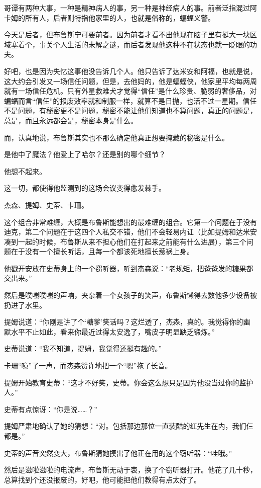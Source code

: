 \documentclass[../main.tex]{subfiles}
\begin{document}
哥谭有两种大事，一种是精神病人的事，另一种是神经病人的事。前者泛指混过阿卡姆的所有人，后者则特指他家里的人，也就是俗称的，蝙蝠义警。

今天是后者，但布鲁斯宁可要前者。因为前者才看不出他现在脑子里有挺大一块区域塞着个，事关个人生活的未解之谜，而后者发现他这种不在状态也就一眨眼的功夫。

好吧，也是因为失忆这事他没告诉几个人。他只告诉了达米安和阿福，也就是说，这大约会引发又一场信任问题，但是，去他妈的，他是蝙蝠侠，他家里平均每两周就有一场信任危机。只有外星救难犬才觉得“信任”是什么珍贵、脆弱的奢侈品，对蝙蝠而言“信任”的报废效率就和制服一样，就算不是日抛，也活不过一星期。信任不是问题，有秘密更不是问题，秘密不能让他们知道也不算问题，真正的问题是，总是，而且永远都会是，秘密本身是什么。

而，认真地说，布鲁斯其实也不那么确定他真正想要掩藏的秘密是什么。

是他中了魔法？他爱上了哈尔？还是别的哪个细节？

他想不起来。

这一切，都使得他监测到的这场会议变得愈发棘手。

杰森、提姆、史蒂、卡珊。

这个组合非常难缠，大概是布鲁斯能想出的最难缠的组合。它第一个问题在于没有迪克，第二个问题在于这四个人私交不错，他们不会轻易内讧（比如提姆和达米安凑到一起的时候，布鲁斯从来不担心他们在打起来之前能有什么进展），第三个问题在于没有一个擅长听话，且每一个都该死地擅长惹祸上身。

他戳开安放在史蒂身上的一个窃听器，听到杰森说：“老规矩，把爸爸发的糖果都交出来。”

然后是噗嗤噗嗤的声响，夹杂着一个女孩子的笑声，布鲁斯懒得去数他多少设备被扔进了水里。

提姆说道：“你刚是讲了个`糖爹'笑话吗？这烂透了，杰森，真的。我觉得你的幽默水平不止如此，看来你最近过得太安逸了，嘴皮子明显缺乏锻炼。”

史蒂说道：“我不知道，提姆，我觉得还挺有趣的。”

卡珊“噫”了一声，而杰森赞许地把一个“嗯”拖了长音。

提姆开始教育史蒂：“这才不好笑，史蒂。你会这么想只是因为他没当过你的监护人。”

史蒂有点惊讶：“你是说……？”

提姆严肃地确认了她的猜想：“对。包括那边那位一直装酷的红先生在内，我们仨都是。”

史蒂的声音突然变大，布鲁斯猜她摸出了他正在用的这个窃听器：“哇哦。”

然后是滋啦滋啦的电流声，布鲁斯无动于衷，换了个窃听器打开。他花了几十秒，总算找到个还没报废的，好吧，他可能把他们教得有点太好了。
\end{document}
